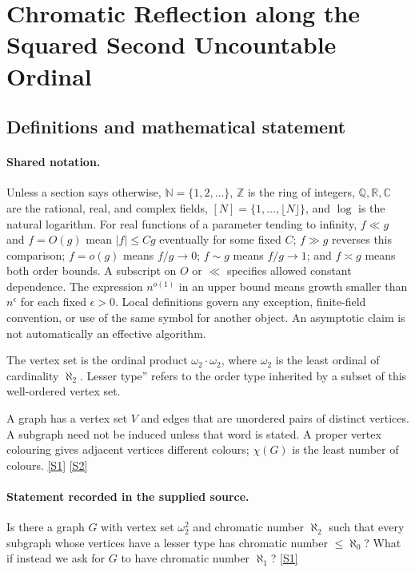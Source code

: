 \documentclass[11pt,a4paper]{article}
\newcommand{\N}{\mathbb{N}}
\newcommand{\Z}{\mathbb{Z}}
\newcommand{\Q}{\mathbb{Q}}
\newcommand{\R}{\mathbb{R}}
\newcommand{\C}{\mathbb{C}}
\newcommand{\sref}[2]{\hyperlink{source:#1:#2}{[S#2]}}
\begin{document}
\section{Chromatic Reflection along the Squared Second Uncountable Ordinal}\label{statement}


\subsection{Definitions and mathematical statement}

\paragraph{Shared notation.}Unless a section says otherwise, $\N=\{1,2,\ldots\}$,
$\Z$ is the ring of integers, $\Q,\R,\C$ are the rational, real, and complex
fields, $[N]=\{1,\ldots,\lfloor N\rfloor\}$, and $\log$ is the natural
logarithm. For real functions of a parameter tending to infinity,
$f\ll g$ and $f=O(g)$ mean $|f|\leq Cg$ eventually for some fixed $C$;
$f\gg g$ reverses this comparison; $f=o(g)$ means $f/g\to0$;
$f\sim g$ means $f/g\to1$; and $f\asymp g$ means both order bounds.
A subscript on $O$ or $\ll$ specifies allowed constant dependence.
The expression $n^{o(1)}$ in an upper bound means growth smaller than
$n^\epsilon$ for each fixed $\epsilon>0$. Local definitions govern any
exception, finite-field convention, or use of the same symbol for another
object. An asymptotic claim is not automatically an effective algorithm.



The vertex set is the ordinal product $\omega_2\cdot\omega_2$, where $\omega_2$ is the least ordinal of cardinality $\aleph_2$. Lesser type'' refers to the order type inherited by a subset of this well-ordered vertex set.

A graph has a vertex set $V$ and edges that are unordered pairs of distinct vertices. A subgraph need not be induced unless that word is stated. A proper vertex colouring gives adjacent vertices different colours; $\chi(G)$ is the least number of colours. \sref{statement}{1} \sref{statement}{2}

\paragraph{Statement recorded in the supplied source.}
Is there a graph $G$ with vertex set $\omega_2^2$ and chromatic number $\aleph_2$ such that every subgraph whose vertices have a lesser type has chromatic number $\leq \aleph_0$?
What if instead we ask for $G$ to have chromatic number $\aleph_1$? \sref{statement}{1}
\end{document}

